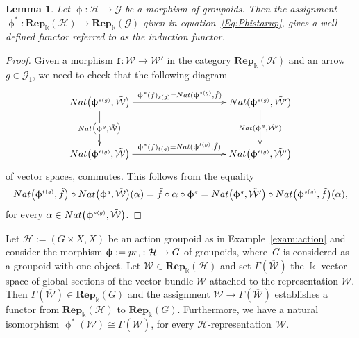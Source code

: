\documentclass[11pt]{article}
\numberwithin{equation}{section}
\newtheorem{Lemma}[Theorem]{Lemma}
\newcommand{\bara}[1]{\overline{#1}}
\newcommand{\Rep}[1]{\mathbf{Rep}_{\Sscript{\Bbbk}}(#1)}
\newcommand{\tF}{\texttt{f}}
\newcommand{\Ga}{\cG_{\Sscript{1}}}
\newcommand{\cG}{{\mathcal G}}
\newcommand{\cH}{{\mathcal H}}
\newcommand{\cW}{{\mathcal W}}
\newcommand{\Sscript}[1]{\scriptscriptstyle{#1}}
\begin{document}
\begin{Lemma}\label{lema:Induction}Let $\upphi\colon \cH \to \cG$ be a morphism of groupoids. Then the assignment $\upphi^{*}\colon \Rep{\cH} \to \Rep{\cG}$ given in equation~\eqref{Eq:Phistarup}, gives a well defined functor referred to as {\rm the induction functor}.
\end{Lemma}
\begin{proof}Given a morphism $\tF\colon \cW \to \cW'$ in the category $\Rep{\cH}$ and an arrow $g \in \Ga$, we need to check that the following diagram
\begin{gather*}
\xymatrix@C=45pt@R=35pt{ {\rm Nat}\big(\upphi^{\Sscript{s(g)}},
\tilde{\cW}\big) \ar@{->}^-{ \upphi^*(\tF)_{\Sscript{s(g)}} = {\rm
Nat}(\upphi^{\Sscript{s(g)}},\tilde{\tF})}[rr] \ar@{->}|-{{\rm
Nat}\big(\upphi^{\Sscript{g}}, \tilde{\cW}\big)}[d] & & {\rm
Nat}(\upphi^{\Sscript{s(g)}}, \tilde{\cW'}) \ar@{->}|-{{\rm
Nat}(\upphi^{\Sscript{g}}, \tilde{\cW'})}[d] \\ {\rm
Nat}\big(\upphi^{\Sscript{t(g)}}, \tilde{\cW}\big) \ar@{->}^-{
\upphi^*(\tF)_{\Sscript{t(g)}} = {\rm
Nat}(\upphi^{\Sscript{t(g)}},\tilde{\tF})}[rr] & & {\rm
Nat}\big(\upphi^{\Sscript{t(g)}}, \tilde{\cW'}\big) }
\end{gather*}
of vector spaces, commutes. This follows from the equality
\begin{gather*}
{\rm Nat}\big(\upphi^{\Sscript{t(g)}},\tilde{\tF}\big) \circ {\rm Nat}\big(\upphi^{\Sscript{g}}, \tilde{\cW}\big) (\alpha)
 = \tilde{\tF} \circ \alpha \circ \upphi^{\Sscript{g}} = {\rm Nat}\big(\upphi^{\Sscript{g}}, \tilde{\cW'}\big) \circ {\rm Nat}\big(\upphi^{\Sscript{s(g)}},\tilde{\tF}\big) (\alpha),
\end{gather*}
for every $\alpha \in {\rm Nat}\big(\upphi^{\Sscript{s(g)}},\tilde{\cW}\big)$.
\end{proof}

\begin{Example}\label{exam:GM}Let $\cH:=(G\times X, X)$ be an action groupoid as in Example~\ref{exam:action} and consider the morphism $\upphi:={\rm pr}_{\Sscript{1}}\colon \cH \to G$ of groupoids, where~$G$ is considered as a groupoid with one object. Let $\cW \in \Rep{\cH}$ and set $\Gamma(\bara{\cW})$ the $\Bbbk$-vector space of global sections of the vector bundle $\bara{\cW}$ attached to the representation $\cW$. Then $\Gamma(\bara{\cW}) \in \Rep{G}$ and the assignment $\cW \to \Gamma(\bara{\cW})$ establishes a functor from $\Rep{\cH}$ to $\Rep{G}$. Furthermore, we have a natural isomorphism $\upphi^{\Sscript{*}}(\cW) \cong \Gamma(\bara{\cW})$, for every $\cH$-representation~$\cW$.
\end{Example}
\end{document}
